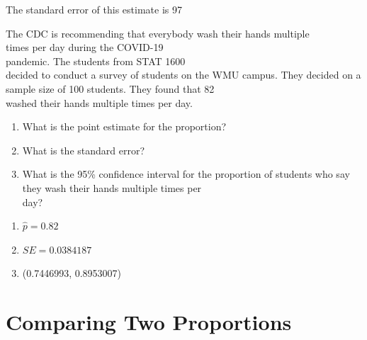 \documentclass[11pt, chapterprefix=true]{scrbook}\usepackage[]{graphicx}\usepackage[]{color}
\begin{document}
\begin{exercises}
\begin{exercise}
\end{exercise}
\begin{solution} %


The standard error of this estimate is 97

\end{solution}

\begin{exercise}   %



The CDC is recommending that everybody wash their hands multiple \\ times per day during the COVID-19 \\ pandemic.  The students from STAT 1600 \\ decided to conduct a survey of students on the WMU campus.  They decided on a sample size of 100 students.  They found that 82 \\ washed their hands multiple times per day.

\begin{enumerate}
\item What is the point estimate for the proportion?
\item What is the standard error?
\item What is the 95\% confidence interval for the proportion of students who say they wash their hands multiple times per \\ day?
\end{enumerate}

\end{exercise}
\begin{solution}   %

\begin{enumerate}
\item $\hat{p} = 0.82$ 
\item $SE = 0.0384187$ 
\item (0.7446993, 0.8953007)
\end{enumerate}

\end{solution}

\end{exercises}

\onecolumn



\chapter{Comparing Two Proportions }
\label{chap:ch9}
\end{document}
